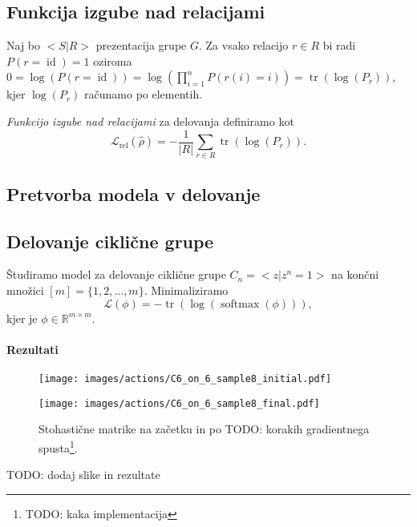 \documentclass[mat2, tisk]{fmfdelo}
\newcommand{\TODO}[1]{{\color{blue} TODO: #1}}
\newcommand{\R}{\mathbb R}
\newcommand{\loss }{\mathcal L}
\newcommand{\Loss}[1]{\mathcal L _\text{#1}}
\begin{document}
\subsection{Funkcija izgube nad relacijami}
Naj bo $<S|R>$ prezentacija grupe $G$. Za vsako relacijo $r \in R$ bi radi $P(r = \operatorname{id}) =1$ oziroma $0 = \log(P(r=\operatorname{id})) = \log(\prod_{i=1}^n P(r(i)=i)) = \operatorname{tr}(\log(P_r))$, kjer $\log(P_r)$ računamo po elementih. 
\begin{definicija}
    \emph{Funkcijo izgube nad relacijami} za delovanja definiramo kot 
    \begin{equation}
        \label{eq:relation loss actions}
        \Loss{rel} (\hat\rho) = - \frac{1}{|R|} \sum_{r \in R} \operatorname{tr}(\log(P_r)).
    \end{equation}
\end{definicija}
\subsection{Pretvorba modela v delovanje}

\subsection{Delovanje ciklične grupe}
Študiramo model za delovanje ciklične grupe $C_n = <z | z^n=1>$ na končni množici $[m] = \{1,2,\dotsc, m\}$. Minimaliziramo
$$
\loss(\phi) = - \operatorname{tr}(\log (\operatorname{softmax}(\phi))),
$$
kjer je $\phi \in \R^{m \times m}$.
\paragraph{Rezultati}
\begin{figure}
    \centering
    \begin{minipage}{0.49\textwidth}
            \centering
            \texttt{[image: images/actions/C6\_on\_6\_sample8\_initial.pdf]}
            \caption*{$n=6, m=6$}
        \end{minipage} 
        \begin{minipage}{0.49\textwidth}
            \centering
            \texttt{[image: images/actions/C6\_on\_6\_sample8\_final.pdf]}
            \caption*{Model konvergira k $(154)(236)$.}
        \end{minipage} 
    \caption[Stohastične matrike na začetku in po \TODO korakih gradientnega spusta.]{Stohastične matrike na začetku in po \TODO korakih gradientnega spusta\footnote{\TODO kaka implementacija}.}
    \label{fig:actions-cn}
\end{figure}
\TODO{dodaj slike in rezultate}
\end{document}
